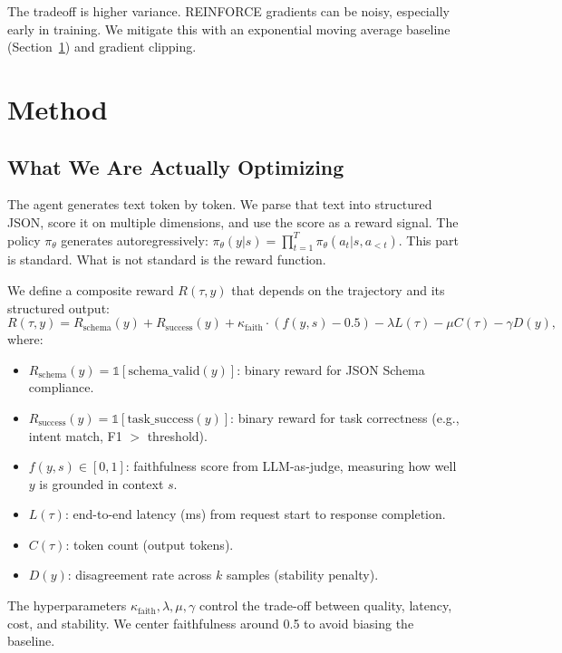\documentclass[11pt]{article}
\begin{document}
The tradeoff is higher variance.
REINFORCE gradients can be noisy, especially early in training.
We mitigate this with an exponential moving average baseline (Section~\ref{sec:method}) and gradient clipping.

\section{Method}
\label{sec:method}

\subsection{What We Are Actually Optimizing}

The agent generates text token by token.
We parse that text into structured JSON, score it on multiple dimensions, and use the score as a reward signal.
The policy $\pi_\theta$ generates autoregressively: $\pi_\theta(y | s) = \prod_{t=1}^{T} \pi_\theta(a_t | s, a_{<t})$.
This part is standard.
What is not standard is the reward function.

We define a composite reward $R(\tau, y)$ that depends on the trajectory and its structured output:
\begin{equation}
R(\tau, y) = R_{\text{schema}}(y) + R_{\text{success}}(y) + \kappa_{\text{faith}} \cdot (f(y, s) - 0.5) - \lambda L(\tau) - \mu C(\tau) - \gamma D(y),
\end{equation}
where:
\begin{itemize}[leftmargin=12pt]
    \item $R_{\text{schema}}(y) = \mathbb{1}[\text{schema\_valid}(y)]$: binary reward for JSON Schema compliance.
    \item $R_{\text{success}}(y) = \mathbb{1}[\text{task\_success}(y)]$: binary reward for task correctness (e.g., intent match, F1 $>$ threshold).
    \item $f(y, s) \in [0,1]$: faithfulness score from LLM-as-judge, measuring how well $y$ is grounded in context $s$.
    \item $L(\tau)$: end-to-end latency (ms) from request start to response completion.
    \item $C(\tau)$: token count (output tokens).
    \item $D(y)$: disagreement rate across $k$ samples (stability penalty).
\end{itemize}

The hyperparameters $\kappa_{\text{faith}}, \lambda, \mu, \gamma$ control the trade-off between quality, latency, cost, and stability.
We center faithfulness around 0.5 to avoid biasing the baseline.
\end{document}
